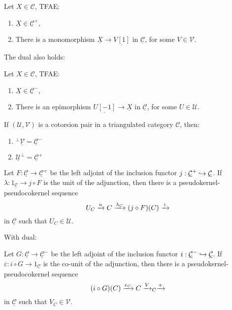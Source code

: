 \begin{lemma}\label{sec1:lem1}
  Let $X\in\mathcal{C}$, TFAE:
  \begin{enumerate}
    \item $\underline{X} \in \underline{\mathcal{C}}^+$,
    \item There is a monomorphism $\underline{X}\to \underline{V[1]}$ in
    $\underline{\mathcal{C}}$, for some $V\in\mathcal{V}$.
  \end{enumerate}
\end{lemma}

The dual also holds:

\begin{lemma}
  Let $X\in\mathcal{C}$, TFAE:
  \begin{enumerate}
    \item $\underline{X} \in \underline{\mathcal{C}}^-$,
    \item There is an epimorphism $\underline{U[-1]}\to \underline{X}$ in
    $\underline{\mathcal{C}}$, for some $U\in\mathcal{U}$.
  \end{enumerate}
\end{lemma}

\begin{corollary}
  If $(\mathcal{U},\mathcal{V})$ is a cotorsion pair in a triangulated category
  $\mathcal{C}$, then:
  \begin{enumerate}
    \item $^\perp\underline{\mathcal{V}} = \underline{\mathcal{C}}^-$
    \item $\underline{\mathcal{U}}^\perp = \underline{\mathcal{C}}^+$
  \end{enumerate}
\end{corollary}

\begin{lemma}\label{sec1:lem2}
  Let $F:\underline{\mathcal{C}}\to\underline{\mathcal{C}}^+$ be the left adjoint
  of the inclusion functor $j:\underline{\mathcal{C}}^+ \hookrightarrow \underline{\mathcal{C}}$.
  If $\lambda:1_{\underline{\mathcal{C}}} \to j\circ F$ is the unit of the adjunction, then there is a pseudokernel-pseudocokernel
  sequence
  \begin{equation*}
    U_C\xrightarrow{u}C\xrightarrow{\lambda_{C}}(j\circ F)(C)\xrightarrow{+}
  \end{equation*}
  in $\underline{\mathcal{C}}$ such that $U_C\in \mathcal{U}$.
\end{lemma}

With dual:

\begin{lemma}
  Let $G:\underline{\mathcal{C}}\to\underline{\mathcal{C}}^-$ be the left adjoint
  of the inclusion functor $i:\underline{\mathcal{C}}^-\hookrightarrow \underline{\mathcal{C}}$.
  If $\varepsilon:i\circ G \to 1_{\underline{\mathcal{C}}}$ is the co-unit of the adjunction, then there is a pseudokernel-pseudocokernel
  sequence
  \begin{equation*}
    (i\circ G)(C) \xrightarrow{\varepsilon_{C}} C\xrightarrow{V}_C \xrightarrow{+}
  \end{equation*}
  in $\underline{\mathcal{C}}$ such that $V_C\in \mathcal{V}$.
\end{lemma}

